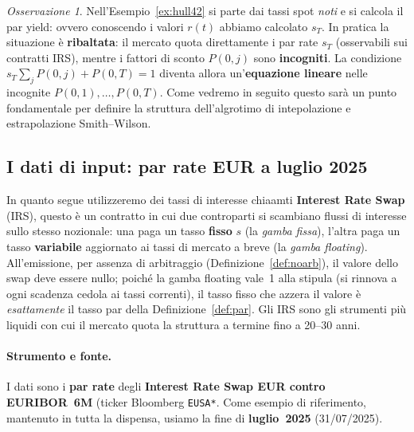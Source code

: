 \documentclass[11pt,a4paper]{article}
\theoremstyle{plain}
\theoremstyle{definition}
\theoremstyle{remark}
\newtheorem*{osservazione}{Osservazione}
\begin{document}
\begin{osservazione}
\label{oss:inversione}
Nell'Esempio~\ref{ex:hull42} si parte dai tassi spot \emph{noti} e si calcola il par
yield: ovvero conoscendo i valori $r(t)$ abbiamo calcolato $s_T$. In pratica la situazione \`e \textbf{ribaltata}:
il mercato quota direttamente i par rate $s_T$ (osservabili sui contratti IRS), mentre i
fattori di sconto $P(0,j)$ sono \textbf{incogniti}. La condizione
$s_T\sum_{j}P(0,j)+P(0,T)=1$ diventa allora un'\textbf{equazione lineare} nelle
incognite $P(0,1),\ldots,P(0,T)$. Come vedremo in seguito questo sarà un punto fondamentale per definire la struttura dell'algrotimo di intepolazione e estrapolazione Smith--Wilson.%
\end{osservazione}



\subsection{I dati di input: par rate EUR a luglio 2025}
\label{sec:dati-input}
In quanto segue utilizzeremo dei tassi di interesse chiaamti \textbf{Interest Rate Swap} (IRS), questo \`e un contratto in cui due controparti si scambiano
flussi di interesse sullo stesso nozionale: una paga un tasso \textbf{fisso} $s$ (la
\emph{gamba fissa}), l'altra paga un tasso \textbf{variabile} aggiornato ai tassi di
mercato a breve (la \emph{gamba floating}). All'emissione, per assenza di arbitraggio
(Definizione~\ref{def:noarb}), il valore dello swap deve essere nullo; poich\'e la gamba
floating vale~1 alla stipula (si rinnova a ogni scadenza cedola ai tassi correnti), il
tasso fisso che azzera il valore \`e \emph{esattamente} il tasso par della
Definizione~\ref{def:par}. Gli IRS sono gli strumenti pi\`u liquidi con cui il mercato
quota la struttura a termine fino a 20--30 anni.

\paragraph{Strumento e fonte.} I dati sono i \textbf{par rate} degli \textbf{Interest Rate
Swap EUR contro EURIBOR~6M} (ticker Bloomberg \texttt{EUSA*}. Come esempio di riferimento, mantenuto in tutta la dispensa,
usiamo la fine di \textbf{luglio~2025} (31/07/2025).
\end{document}
